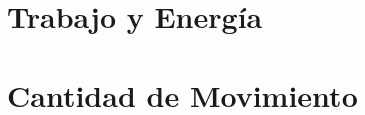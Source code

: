 \documentclass[12pt, a4paper, twoside]{book}
\begin{document}
% 
% 
% 

% 
% 
% 

\chapter{Trabajo y Energía}

% 
% 
% 

% 
% 
% 

% 
% 
% 

% 
% 
% 

% 
% 
% 

\chapter{Cantidad de Movimiento}

% 
% 
% 

% 
% 
% 

% 
% 
% 
\end{document}
